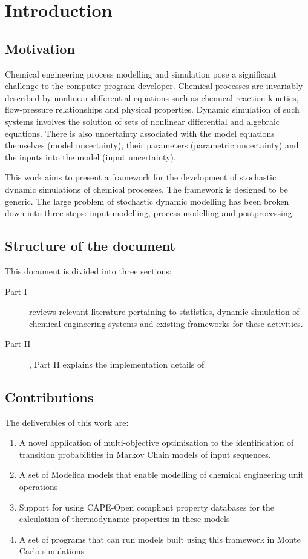 \chapter{Introduction}\label{chap:intro}

\section{Motivation}
Chemical engineering process modelling and simulation pose a
significant challenge to the computer program developer.  Chemical
processes are invariably described by nonlinear differential equations
such as chemical reaction kinetics, flow-pressure relationships and
physical properties.  Dynamic simulation of such systems involves the
solution of sets of nonlinear differential and algebraic equations.
There is also uncertainty associated with the model equations
themselves (model uncertainty), their parameters (parametric
uncertainty) and the inputs into the model (input uncertainty).

This work aims to present a framework for the development of
stochastic dynamic simulations of chemical processes. The framework is
designed to be generic. The large problem of stochastic dynamic
modelling has been broken down into three steps: input modelling,
process modelling and postprocessing.

\section{Structure of the document}
This document is divided into three sections: 
\begin{description}
\item[Part I] reviews relevant literature pertaining to statistics,
  dynamic simulation of chemical engineering systems and existing
  frameworks for these activities.
\item[Part II], Part II explains the implementation details of 
\end{description}

\section{Contributions}
The deliverables of this work are:
\begin{enumerate}
\item A novel application of multi-objective optimisation to the identification of transition probabilities in Markov Chain models of input sequences.
\item A set of Modelica models that enable modelling of chemical engineering unit operations
\item Support for using CAPE-Open compliant property databases for the calculation of thermodynamic properties in these models
\item A set of programs that can run models built using this framework in Monte Carlo simulations
\end{enumerate}

